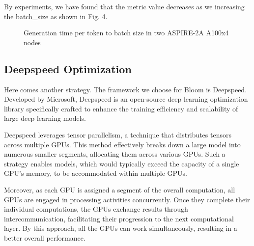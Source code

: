 By experiments, we have found that the metric value decreases as we increasing the batch\_size as shown in Fig. 4.

\begin{figure}
\centering
{}
\caption{Generation time per token to batch size in two ASPIRE-2A A100x4 nodes}
\end{figure}


\subsection{Deepspeed Optimization}
Here comes another strategy. The framework we choose for Bloom is Deepspeed. Developed by Microsoft, Deepspeed is an open-source deep learning optimization library specifically crafted to enhance the training efficiency and scalability of large deep learning models.

Deepspeed leverages tensor parallelism, a technique that distributes tensors across multiple GPUs. This method effectively breaks down a large model into numerous smaller segments, allocating them across various GPUs. Such a strategy enables models, which would typically exceed the capacity of a single GPU's memory, to be accommodated within multiple GPUs.

Moreover, as each GPU is assigned a segment of the overall computation, all GPUs are engaged in processing activities concurrently. Once they complete their individual computations, the GPUs exchange results through intercommunication, facilitating their progression to the next computational layer. By this approach, all the GPUs can work simultaneously, resulting in a better overall performance.

